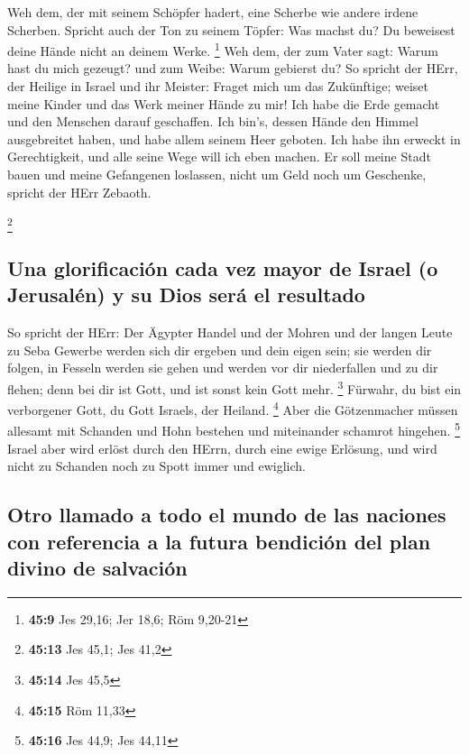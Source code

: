  Weh dem, der mit seinem Schöpfer hadert, eine Scherbe wie
andere irdene Scherben. Spricht auch der Ton zu seinem Töpfer: Was
machst du? Du beweisest deine Hände nicht an deinem Werke. \footnote{\textbf{45:9}
  Jes 29,16; Jer 18,6; Röm 9,20-21}  Weh dem, der zum
Vater sagt: Warum hast du mich gezeugt? und zum Weibe: Warum gebierst
du?  So spricht der HErr, der Heilige in Israel und ihr
Meister: Fraget mich um das Zukünftige; weiset meine Kinder und das Werk
meiner Hände zu mir!  Ich habe die Erde gemacht und den
Menschen darauf geschaffen. Ich bin's, dessen Hände den Himmel
ausgebreitet haben, und habe allem seinem Heer geboten. 
Ich habe ihn erweckt in Gerechtigkeit, und alle seine Wege will ich eben
machen. Er soll meine Stadt bauen und meine Gefangenen loslassen, nicht
um Geld noch um Geschenke, spricht der HErr Zebaoth.

\footnote{\textbf{45:13} Jes 45,1; Jes 41,2}

\hypertarget{una-glorificaciuxf3n-cada-vez-mayor-de-israel-o-jerusaluxe9n-y-su-dios-seruxe1-el-resultado}{%
\subsection{Una glorificación cada vez mayor de Israel (o Jerusalén) y
su Dios será el
resultado}\label{una-glorificaciuxf3n-cada-vez-mayor-de-israel-o-jerusaluxe9n-y-su-dios-seruxe1-el-resultado}}

 So spricht der HErr: Der Ägypter Handel und der Mohren
und der langen Leute zu Seba Gewerbe werden sich dir ergeben und dein
eigen sein; sie werden dir folgen, in Fesseln werden sie gehen und
werden vor dir niederfallen und zu dir flehen; denn bei dir ist Gott,
und ist sonst kein Gott mehr. \footnote{\textbf{45:14} Jes 45,5}
 Fürwahr, du bist ein verborgener Gott, du Gott Israels,
der Heiland. \footnote{\textbf{45:15} Röm 11,33}  Aber
die Götzenmacher müssen allesamt mit Schanden und Hohn bestehen und
miteinander schamrot hingehen. \footnote{\textbf{45:16} Jes 44,9; Jes
  44,11}  Israel aber wird erlöst durch den HErrn, durch
eine ewige Erlösung, und wird nicht zu Schanden noch zu Spott immer und
ewiglich.

\hypertarget{otro-llamado-a-todo-el-mundo-de-las-naciones-con-referencia-a-la-futura-bendiciuxf3n-del-plan-divino-de-salvaciuxf3n}{%
\subsection{Otro llamado a todo el mundo de las naciones con referencia
a la futura bendición del plan divino de
salvación}\label{otro-llamado-a-todo-el-mundo-de-las-naciones-con-referencia-a-la-futura-bendiciuxf3n-del-plan-divino-de-salvaciuxf3n}}

